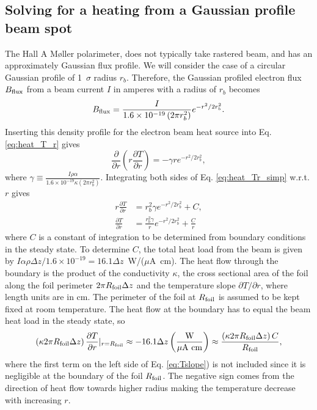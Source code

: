 \documentclass[12pt]{article}
\begin{document}
\subsection{Solving for a heating from a Gaussian profile beam spot}
The Hall A M\o ller polarimeter, does not typically take rastered beam, and has an approximately Gaussian flux profile. We will consider the case of a circular Gaussian profile of 1~$\sigma$ radius $r_b$. Therefore, the Gaussian profiled electron flux $B_{\rm flux}$ from a beam current $I$ in amperes with a radius of $r_{b}$ becomes
\begin{equation}
B_{\rm flux}=\frac{I}{1.6\times 10^{-19} \left(2\pi r_{b}^2\right)}e^{-r^2/2r_b^2}.
\end{equation}
Inserting this density profile for the electron beam heat source into Eq. \ref{eq:heat_T_r} gives
\begin{equation}
\label{eq:heat_Tr_simp}
\frac{\partial}{\partial r}\left(r\frac{\partial T}{\partial r}\right)=-\gamma re^{-r^2/2r_b^2},
\end{equation} 
where $\gamma\equiv\frac{I\rho\alpha}{1.6\times 10^{-19} \kappa\left(2\pi r_{b}^2\right)}$.
Integrating both sides of Eq. \ref{eq:heat_Tr_simp} w.r.t. $r$ gives
\begin{align}
r\frac{\partial T}{\partial r}&=r_b^2\gamma e^{-r^2/2r_b^2}+C,\\
\label{eq:Tslope}
\frac{\partial T}{\partial r}&=\frac{r_b^2\gamma}{r} e^{-r^2/2r_b^2}+\frac{C}{r}
\end{align} 
where $C$ is a constant of integration to be determined from boundary conditions in the steady state. To determine $C$, the total heat load from the beam is given by $I\alpha\rho\Delta z/1.6\times10^{-19}=16.1\Delta z$~W/($\mu$A~cm). The heat flow through the boundary is the product of the conductivity $\kappa$, the cross sectional area of the foil along the foil perimeter $2\pi R_{\rm foil}\Delta z$ and the temperature slope $\partial T /\partial r$, where  length units are in cm. The perimeter of the foil at $R_{\rm foil}$ is assumed to be kept fixed at room temperature. The heat flow at the boundary has to equal the beam heat load in the steady state, so 
\[
\left(\kappa2\pi R_{\rm foil}\Delta z\right) \frac{\partial T}{\partial r}|_{r=R_{\rm foil}}\approx-16.1\Delta z\left(\frac{\textrm{W}}{\mu \textrm{A cm}}\right)\approx\frac{\left(\kappa2\pi R_{\rm foil}\Delta z\right) C}{R_{\rm foil}},
\]
where the first term on the left side of Eq. \ref{eq:Tslope}) is not included since it is negligible at the boundary of the foil $R_{\rm foil}$. The negative sign comes from the direction of heat flow towards higher radius making the temperature decrease with increasing $r$.
\end{document}
